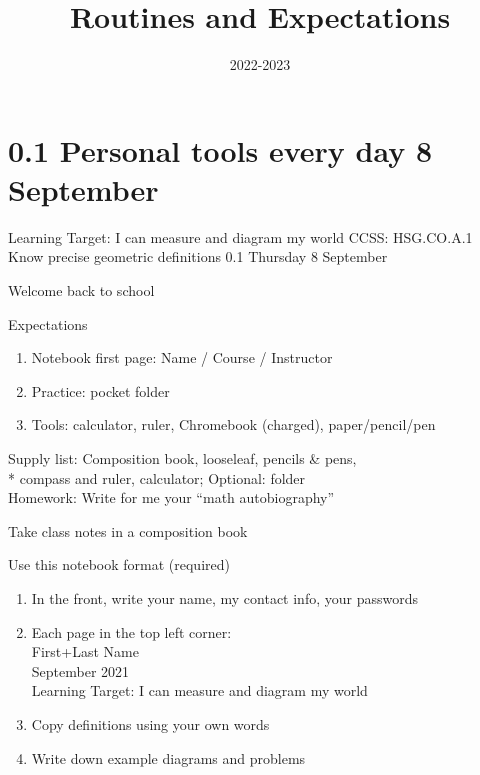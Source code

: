 

\title{Routines and Expectations}
\date{2022-2023}


\frame{\titlepage}

\section[Outline]{}
\frame{\tableofcontents}

\section{0.1 Personal tools every day \hfill 8 September}
\begin{frame}{Learning Target: I can measure and diagram my world}
  {CCSS: HSG.CO.A.1 Know precise geometric definitions \hfill \alert{0.1 Thursday 8 September}}

  Welcome back to school
  \begin{block}{Expectations}
  \begin{enumerate}
      \item Notebook first page: Name / Course / Instructor
      \item Practice: pocket folder
      \item Tools: calculator, ruler, Chromebook (charged), paper/pencil/pen
  \end{enumerate}
  \end{block}
  Supply list: Composition book, looseleaf, pencils \& pens, \\*
  compass and ruler, calculator; Optional: folder \\[0.25cm]
  Homework: Write for me your ``math autobiography''
\end{frame}

\begin{frame}{Take class notes in a composition book}
  \begin{block}{Use this notebook format (required)}
    \begin{enumerate}
      \item In the front, write your name, my contact info, your passwords
      \item Each page in the top left corner: \\ \qquad First+Last Name \\
       September 2021 \\ \qquad Learning Target: I can measure and diagram my world \vspace{0.25cm}
      \item Copy definitions using your own words
      \item Write down example diagrams and problems
    \end{enumerate}
    \end{block}
  \end{frame}

